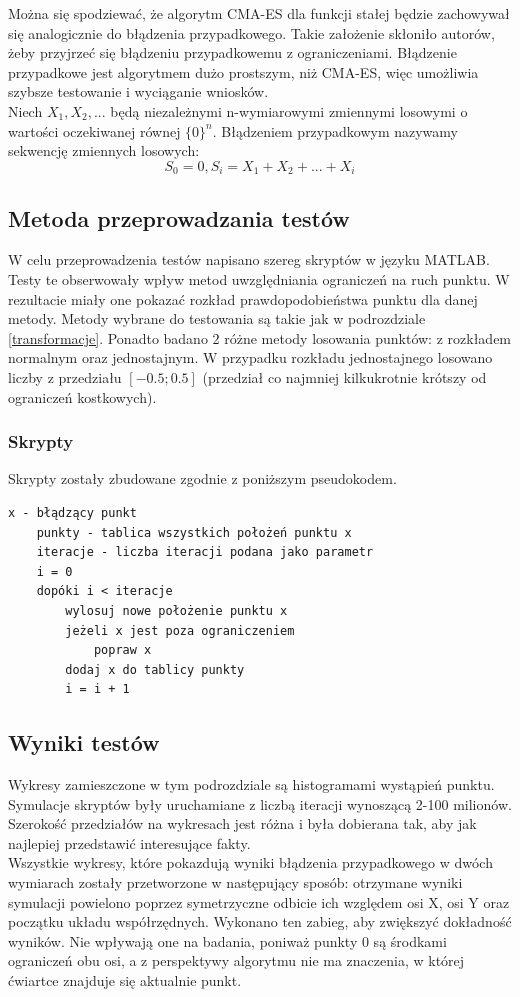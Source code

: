 \documentclass{mini}
\begin{document}
Można się spodziewać, że algorytm CMA-ES dla funkcji stałej będzie zachowywał się analogicznie do błądzenia przypadkowego. Takie założenie skłoniło autorów, żeby przyjrzeć się błądzeniu przypadkowemu z ograniczeniami. Błądzenie przypadkowe jest algorytmem dużo prostszym, niż CMA-ES, więc umożliwia szybsze testowanie i wyciąganie wniosków.\\
Niech $ X_1, X_2, ... $ będą niezależnymi n-wymiarowymi zmiennymi losowymi o wartości oczekiwanej równej $ \{0\}^n $. Błądzeniem przypadkowym nazywamy sekwencję zmiennych losowych:
\begin{equation}
S_0 = 0, S_i=X_1+X_2+...+X_i
\end{equation}

\subsection{Metoda przeprowadzania testów}
W celu przeprowadzenia testów napisano szereg skryptów w języku MATLAB. Testy te obserwowały wpływ metod uwzględniania ograniczeń na ruch punktu. W rezultacie miały one pokazać rozkład prawdopodobieństwa punktu dla danej metody. Metody wybrane do testowania są takie jak w podrozdziale \ref{transformacje}.
Ponadto badano 2 różne metody losowania punktów: z rozkładem normalnym oraz jednostajnym. W przypadku rozkładu jednostajnego losowano liczby z przedziału $[-0.5; 0.5]$ (przedział co najmniej kilkukrotnie krótszy od ograniczeń kostkowych).


\subsubsection*{Skrypty}
Skrypty zostały zbudowane zgodnie z poniższym pseudokodem.
\begin{Verbatim}[baselinestretch=1.1]
	x - błądzący punkt
	punkty - tablica wszystkich położeń punktu x
	iteracje - liczba iteracji podana jako parametr
	i = 0
	dopóki i < iteracje
		wylosuj nowe położenie punktu x
		jeżeli x jest poza ograniczeniem
			popraw x
		dodaj x do tablicy punkty
		i = i + 1
\end{Verbatim}

\subsection{Wyniki testów}
Wykresy zamieszczone w tym podrozdziale są histogramami wystąpień punktu. Symulacje skryptów były uruchamiane z liczbą iteracji wynoszącą 2-100 milionów. Szerokość przedziałów na wykresach jest różna i była dobierana tak, aby jak najlepiej przedstawić interesujące fakty.\\
Wszystkie wykresy, które pokazdują wyniki błądzenia przypadkowego w dwóch wymiarach zostały przetworzone w następujący sposób: otrzymane wyniki symulacji powielono poprzez symetrzyczne odbicie ich względem osi X, osi Y oraz początku układu współrzędnych. Wykonano ten zabieg, aby zwiększyć dokładność wyników. Nie wpływają one na badania, poniważ punkty 0 są środkami ograniczeń obu osi, a z perspektywy algorytmu nie ma znaczenia, w której ćwiartce znajduje się aktualnie punkt.
\end{document}
